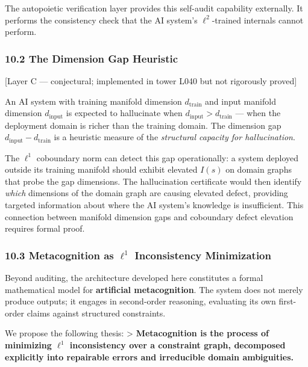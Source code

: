 \documentclass[
]{article}
\begin{document}
The autopoietic verification layer provides this self-audit capability
externally. It performs the consistency check that the AI system's
\(\ell^2\)-trained internals cannot perform.

\subsubsection{10.2 The Dimension Gap
Heuristic}\label{the-dimension-gap-heuristic}

{[}Layer C --- conjectural; implemented in tower L040 but not rigorously
proved{]}

An AI system with training manifold dimension \(d_{\text{train}}\) and
input manifold dimension \(d_{\text{input}}\) is expected to hallucinate
when \(d_{\text{input}} > d_{\text{train}}\) --- when the deployment
domain is richer than the training domain. The dimension gap
\(d_{\text{input}} - d_{\text{train}}\) is a heuristic measure of the
\emph{structural capacity for hallucination}.

The \(\ell^1\) coboundary norm can detect this gap operationally: a
system deployed outside its training manifold should exhibit elevated
\(I(s)\) on domain graphs that probe the gap dimensions. The
hallucination certificate would then identify \emph{which} dimensions of
the domain graph are causing elevated defect, providing targeted
information about where the AI system's knowledge is insufficient. This
connection between manifold dimension gaps and coboundary defect
elevation requires formal proof.

\subsubsection{\texorpdfstring{10.3 Metacognition as \(\ell^1\)
Inconsistency
Minimization}{10.3 Metacognition as \textbackslash ell\^{}1 Inconsistency Minimization}}\label{metacognition-as-ell1-inconsistency-minimization}

Beyond auditing, the architecture developed here constitutes a formal
mathematical model for \textbf{artificial metacognition}. The system
does not merely produce outputs; it engages in second-order reasoning,
evaluating its own first-order claims against structured constraints.

We propose the following thesis: \textgreater{} \textbf{Metacognition is
the process of minimizing \(\ell^1\) inconsistency over a constraint
graph, decomposed explicitly into repairable errors and irreducible
domain ambiguities.}
\end{document}
